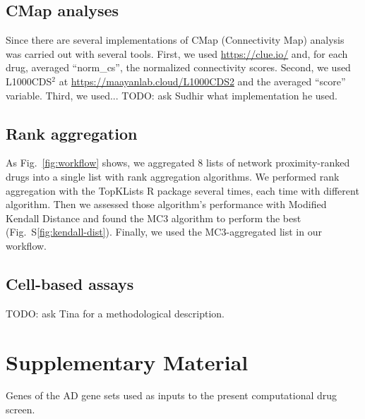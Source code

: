 \documentclass[letterpaper]{article}
\begin{document}
\subsection{CMap analyses}

Since there are several implementations of CMap (Connectivity Map) analysis was carried out with several tools.  First, we used
\url{https://clue.io/} \citep{Lamb2006} and, for each drug, averaged
``norm\_cs'',
the normalized connectivity scores.  Second, we used L1000CDS$^2$ at
\url{https://maayanlab.cloud/L1000CDS2} and the averaged ``score'' variable.
Third, we used... TODO: ask Sudhir what implementation he used.

\subsection{Rank aggregation}

As Fig.~\ref{fig:workflow} shows, we aggregated 8 lists of network
proximity-ranked drugs into a single list with rank aggregation algorithms.
We performed rank aggregation with the TopKLists R package
several times, each time with different algorithm.  Then we assessed those
algorithm's performance with Modified Kendall Distance and found the MC3
algorithm to perform the best (Fig.~S\ref{fig:kendall-dist}).  Finally, we
used the MC3-aggregated list in our workflow.

\subsection{Cell-based assays}

TODO: ask Tina for a methodological description.



\newpage

\section*{Supplementary Material}

\setcounter{table}{0}
\makeatletter 
\renewcommand{\tablename}{Table S} %
\makeatother

\setcounter{figure}{0}
\makeatletter 
\renewcommand{\figurename}{Figure S} %
\makeatother

\begin{table}[p]
\caption{
  Genes of the AD gene sets used as inputs to the present computational drug screen.
}
\label{tab:genes-in-genesets}
\end{table}
\end{document}

